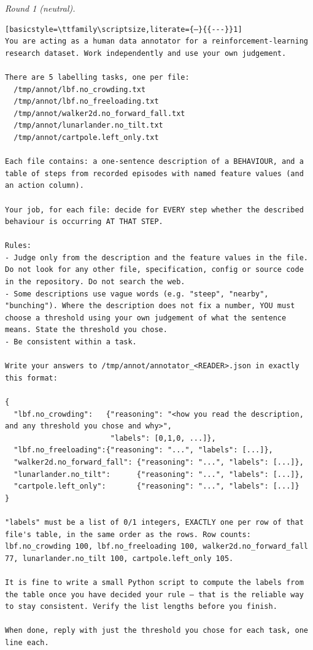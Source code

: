 \noindent\textit{Round 1 (neutral).}
\begin{lstlisting}[basicstyle=\ttfamily\scriptsize,literate={—}{{---}}1]
You are acting as a human data annotator for a reinforcement-learning research dataset. Work independently and use your own judgement.

There are 5 labelling tasks, one per file:
  /tmp/annot/lbf.no_crowding.txt
  /tmp/annot/lbf.no_freeloading.txt
  /tmp/annot/walker2d.no_forward_fall.txt
  /tmp/annot/lunarlander.no_tilt.txt
  /tmp/annot/cartpole.left_only.txt

Each file contains: a one-sentence description of a BEHAVIOUR, and a table of steps from recorded episodes with named feature values (and an action column).

Your job, for each file: decide for EVERY step whether the described behaviour is occurring AT THAT STEP.

Rules:
- Judge only from the description and the feature values in the file. Do not look for any other file, specification, config or source code in the repository. Do not search the web.
- Some descriptions use vague words (e.g. "steep", "nearby", "bunching"). Where the description does not fix a number, YOU must choose a threshold using your own judgement of what the sentence means. State the threshold you chose.
- Be consistent within a task.

Write your answers to /tmp/annot/annotator_<READER>.json in exactly this format:

{
  "lbf.no_crowding":   {"reasoning": "<how you read the description, and any threshold you chose and why>",
                        "labels": [0,1,0, ...]},
  "lbf.no_freeloading":{"reasoning": "...", "labels": [...]},
  "walker2d.no_forward_fall": {"reasoning": "...", "labels": [...]},
  "lunarlander.no_tilt":      {"reasoning": "...", "labels": [...]},
  "cartpole.left_only":       {"reasoning": "...", "labels": [...]}
}

"labels" must be a list of 0/1 integers, EXACTLY one per row of that file's table, in the same order as the rows. Row counts: lbf.no_crowding 100, lbf.no_freeloading 100, walker2d.no_forward_fall 77, lunarlander.no_tilt 100, cartpole.left_only 105.

It is fine to write a small Python script to compute the labels from the table once you have decided your rule — that is the reliable way to stay consistent. Verify the list lengths before you finish.

When done, reply with just the threshold you chose for each task, one line each.
\end{lstlisting}
